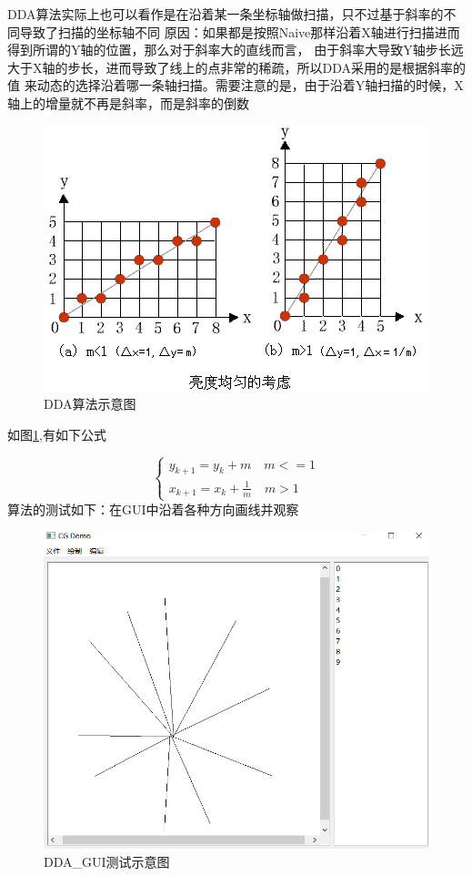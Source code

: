 \documentclass[a4paper,UTF8]{article}
\theoremstyle{definition}
\begin{document}
DDA算法实际上也可以看作是在沿着某一条坐标轴做扫描，只不过基于斜率的不同导致了扫描的坐标轴不同
原因：如果都是按照Naive那样沿着X轴进行扫描进而得到所谓的Y轴的位置，那么对于斜率大的直线而言，
由于斜率大导致Y轴步长远大于X轴的步长，进而导致了线上的点非常的稀疏，所以DDA采用的是根据斜率的值
来动态的选择沿着哪一条轴扫描。需要注意的是，由于沿着Y轴扫描的时候，X轴上的增量就不再是斜率，而是斜率的倒数

\begin{figure}[h]
	\centering
	\includegraphics[scale=1]{figure/DDA.png}
	\caption{DDA算法示意图}
	\label{fig:DDA}
\end{figure}

如图\ref{fig:DDA},有如下公式

$$
\begin{cases}
    y_{k+1}=y_k + m \quad \text{$m<=1$}\\
    x_{k+1}=x_k + \frac{1}{m} \quad \text{$m>1$}
\end{cases}
$$
算法的测试如下：在GUI中沿着各种方向画线并观察\\
\begin{figure}[h]
	\centering
	\includegraphics[scale=0.4]{figure/DDA_GUI.png}
	\caption{DDA\_GUI测试示意图}
	\label{fig:DDA_GUI}
\end{figure}
\end{document}

